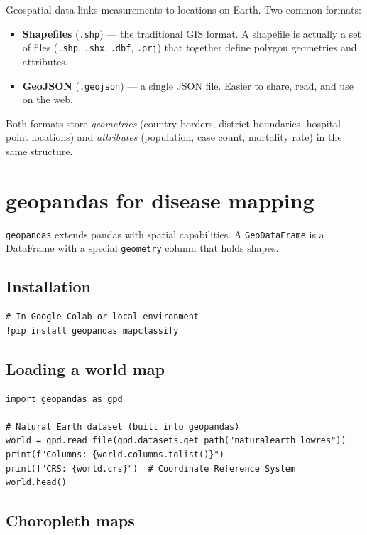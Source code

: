 Geospatial data links measurements to locations on Earth. Two common formats:

\begin{itemize}
  \item \textbf{Shapefiles} (\texttt{.shp}) --- the traditional GIS format. A shapefile is actually a set of files (\texttt{.shp}, \texttt{.shx}, \texttt{.dbf}, \texttt{.prj}) that together define polygon geometries and attributes.
  \item \textbf{GeoJSON} (\texttt{.geojson}) --- a single JSON file. Easier to share, read, and use on the web.
\end{itemize}

Both formats store \emph{geometries} (country borders, district boundaries, hospital point locations) and \emph{attributes} (population, case count, mortality rate) in the same structure.

\section{geopandas for disease mapping}

\texttt{geopandas} extends pandas with spatial capabilities. A \texttt{GeoDataFrame} is a DataFrame with a special \texttt{geometry} column that holds shapes.

\subsection{Installation}

\begin{verbatim}
# In Google Colab or local environment
!pip install geopandas mapclassify
\end{verbatim}

\subsection{Loading a world map}

\begin{verbatim}
import geopandas as gpd

# Natural Earth dataset (built into geopandas)
world = gpd.read_file(gpd.datasets.get_path("naturalearth_lowres"))
print(f"Columns: {world.columns.tolist()}")
print(f"CRS: {world.crs}")  # Coordinate Reference System
world.head()
\end{verbatim}

\subsection{Choropleth maps}

